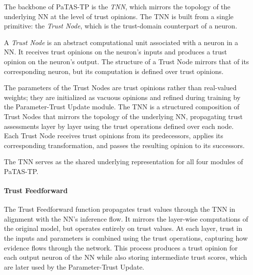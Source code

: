 The backbone of \ac{PaTAS-TP} is the \emph{\acf{TNN}}, which mirrors the topology of the underlying \ac{NN} at the level of trust opinions. The \ac{TNN} is built from a single primitive: the \emph{Trust Node}, which is the trust-domain counterpart of a neuron.
\begin{definition}
A \emph{Trust Node} is an abstract computational unit associated with a neuron in a \ac{NN}. It receives trust opinions on the neuron’s inputs and produces a trust opinion on the neuron’s output. The structure of a Trust Node mirrors that of its corresponding neuron, but its computation is defined over trust opinions.
\end{definition}
\noindent The parameters of the Trust Nodes are trust opinions rather than real-valued weights; they are initialized as vacuous opinions and refined during training by the Parameter-Trust Update module. The \ac{TNN} is a structured composition of Trust Nodes that mirrors the topology of the underlying \ac{NN}, propagating trust assessments layer by layer using the trust operations defined over each node. Each Trust Node receives trust opinions from its predecessors, applies its corresponding transformation, and passes the resulting opinion to its successors. 

The \ac{TNN} serves as the shared underlying representation for all four modules of \ac{PaTAS-TP}. 

\paragraph{Trust Feedforward}
The Trust Feedforward function propagates trust values through the \ac{TNN} in alignment with the \ac{NN}’s inference flow. It mirrors the layer-wise computations of the original model, but operates entirely on trust values. At each layer, trust in the inputs and parameters is combined using the trust operations, capturing how evidence flows through the network. This process produces a trust opinion for each output neuron of the \ac{NN} while also storing intermediate trust scores, which are later used by the Parameter-Trust Update.


